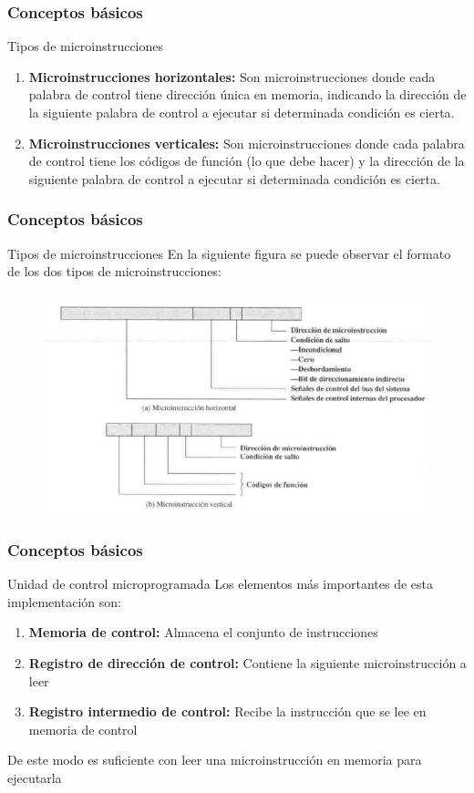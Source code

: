 \documentclass{beamer}
\begin{document}
\begin{frame}
	\frametitle{Conceptos básicos}
	\begin{block}{Tipos de microinstrucciones}
	\begin{enumerate}
		\item \textbf{Microinstrucciones horizontales:} Son microinstrucciones donde cada palabra de control tiene dirección única en memoria, indicando la dirección de la siguiente palabra de control a ejecutar si determinada condición es cierta.
		\item \textbf{Microinstrucciones verticales:} Son microinstrucciones donde cada palabra de control tiene los códigos de función (lo que debe hacer) y la dirección de la siguiente palabra de control a ejecutar si determinada condición es cierta.		
	\end{enumerate}
	\end{block}	
\end{frame}

\begin{frame}
	\frametitle{Conceptos básicos}
	\begin{block}{Tipos de microinstrucciones}
	En la siguiente figura se puede observar el formato de los dos tipos de microinstrucciones:
	\end{block}	
	\begin{figure}[H]
		\centering
		\includegraphics[scale=0.3]{imagenes/microinstruccion.png} 
	\end{figure}
\end{frame}


\begin{frame}
	\frametitle{Conceptos básicos}
	\begin{block}{Unidad de control microprogramada}
	Los elementos más importantes de esta implementación son:
	\begin{enumerate}
		\item \textbf{Memoria de control:} Almacena el conjunto de instrucciones
		\item \textbf{Registro de dirección de control:} Contiene la siguiente microinstrucción a leer
		\item \textbf{Registro intermedio de control:} Recibe la instrucción que se lee en memoria de control
	\end{enumerate}
	De este modo es suficiente con leer una microinstrucción en memoria para ejecutarla
	\end{block}	
	
\end{frame}
\end{document}
